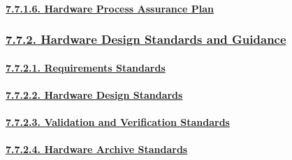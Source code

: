 \documentclass[
]{article}
\begin{document}
\hypertarget{hardware-process-assurance-plan}{%
\paragraph{\texorpdfstring{\protect\hyperlink{hardware-process-assurance-plan-1}{7.7.1.6.
Hardware Process Assurance
Plan}}{7.7.1.6. Hardware Process Assurance Plan}}\label{hardware-process-assurance-plan}}

\hypertarget{hardware-design-standards-and-guidance}{%
\subsubsection{\texorpdfstring{\protect\hyperlink{hardware-design-standards-and-guidance-1}{7.7.2.
Hardware Design Standards and
Guidance}}{7.7.2. Hardware Design Standards and Guidance}}\label{hardware-design-standards-and-guidance}}

\hypertarget{requirements-standards}{%
\paragraph{\texorpdfstring{\protect\hyperlink{requirements-standards-1}{7.7.2.1.
Requirements
Standards}}{7.7.2.1. Requirements Standards}}\label{requirements-standards}}

\hypertarget{hardware-design-standards}{%
\paragraph{\texorpdfstring{\protect\hyperlink{hardware-design-standards-1}{7.7.2.2.
Hardware Design
Standards}}{7.7.2.2. Hardware Design Standards}}\label{hardware-design-standards}}

\hypertarget{validation-and-verification-standards}{%
\paragraph{\texorpdfstring{\protect\hyperlink{validation-and-verification-standards-1}{7.7.2.3.
Validation and Verification
Standards}}{7.7.2.3. Validation and Verification Standards}}\label{validation-and-verification-standards}}

\hypertarget{hardware-archive-standards}{%
\paragraph{\texorpdfstring{\protect\hyperlink{hardware-archive-standards-1}{7.7.2.4.
Hardware Archive
Standards}}{7.7.2.4. Hardware Archive Standards}}\label{hardware-archive-standards}}
\end{document}
